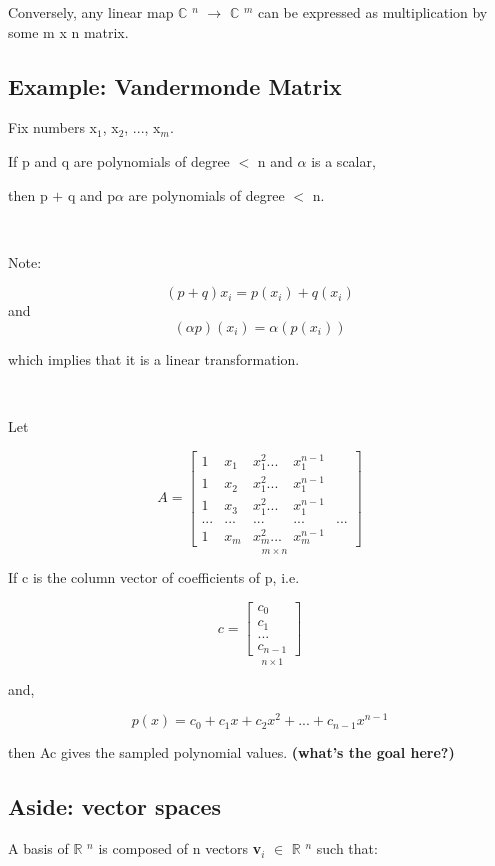 \documentclass[12pt]{article}
\newcommand{\mt}[1]{\ensuremath{#1}}
\newcommand\ssc[2][\DefaultOpt]{%
  \def\DefaultOpt{#2}%
  \subsection[#1]{#2}%
}
\newcommand{\br}{\mt{\mathbb{R}} }       %
\newcommand{\bc}{\mt{\mathbb{C}} }       %
\newcommand{\afa}{\mt{\alpha} }
\newcommand{\mem}{\mt{\in} }
\newcommand{\lra}{ \mt{\longrightarrow} } %
\newcommand{\ps}{\mt{+} }
\newcommand{\ls}{\mt{<} }
\newcommand{\uw}[2]{#1\mt{_{#2}}}
\newcommand{\uf}[2]{#1\mt{^{#2}}}
\newcommand{\mxc}[5]{ %
\underset{#5 \times 1}{
  \begin{bmatrix}
     #1 \\
     #2 \\
     #3 \\
     #4
  \end{bmatrix}
  }
}
\begin{document}
{Conversely, any linear map \uf{\bc}{n} \lra \uf{\bc}{m} can be expressed as multiplication by some m x n matrix.

\ssc{Example: Vandermonde Matrix}{

Fix numbers \uw{x}{1}, \uw{x}{2}, ..., \uw{x}{m}.

If p and q are polynomials of degree \ls n and \afa is a scalar, 

then p \ps q and p\afa are polynomials of degree \ls n.

\

Note: 

\begin{displaymath}
  (p + q)x_i = p(x_i) + q(x_i)
\end{displaymath}
and
\begin{displaymath}
  (\alpha p)(x_i) = \alpha(p(x_i))
\end{displaymath}

which implies that it is a linear transformation.

\

Let

\begin{displaymath}
A = \underset{m \times n}{
\begin{bmatrix}
    1 & x_1 & x_1^2 ... & x_1^{n-1} \\
    1 & x_2 & x_1^2 ... & x_1^{n-1} \\
    1 & x_3 & x_1^2 ... & x_1^{n-1} \\
    ... & ... & ... & ... & ... \\
    1 & x_m & x_m^2 ... & x_m^{n-1} 
  \end{bmatrix}
}
\end{displaymath}
  
If c is the column vector of coefficients of p, i.e.

\begin{displaymath}
  c = \mxc{c_0}{c_1}{...}{c_{n - 1}}{n}
\end{displaymath}

and,

\begin{displaymath}
  p(x) = c_0 + c_1x + c_2x^2 + ... + c_{n - 1}x^{n-1}
\end{displaymath}

then Ac gives the sampled polynomial values. \textbf{(what's the goal here?)}

}

\ssc{Aside: vector spaces}{

A basis of \uf{\br}{n} is composed of n vectors \uw{\textbf{v}}{i} \mem \uf{\br}{n} such that:

}}
\end{document}
